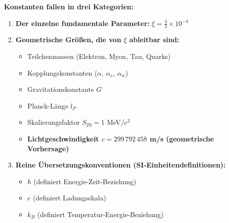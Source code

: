 \documentclass[12pt,a4paper]{article}
\begin{document}
\begin{keyresult}
\textbf{Konstanten fallen in drei Kategorien:}
\begin{enumerate}
\item \textbf{Der einzelne fundamentale Parameter:} $\xi = \frac{4}{3} \times 10^{-4}$

\item \textbf{Geometrische Gr{\"o}{\ss}en, die von $\xi$ ableitbar sind:}
\begin{itemize}
\item Teilchenmassen (Elektron, Myon, Tau, Quarks)
\item Kopplungskonstanten ($\alpha$, $\alpha_s$, $\alpha_w$)
\item Gravitationskonstante $G$
\item Planck-L{\"a}nge $l_P$
\item Skalierungsfaktor $S_{T0} = 1$ MeV/$c^2$
\item \textbf{Lichtgeschwindigkeit $c = 299\,792\,458$ m/s (geometrische Vorhersage)}
\end{itemize}

\item \textbf{Reine {\"U}bersetzungskonventionen (SI-Einheitendefinitionen):}
\begin{itemize}
\item $\hbar$ (definiert Energie-Zeit-Beziehung)
\item $e$ (definiert Ladungsskala)
\item $k_B$ (definiert Temperatur-Energie-Beziehung)
\end{itemize}
\end{enumerate}
\end{keyresult}
\end{document}
